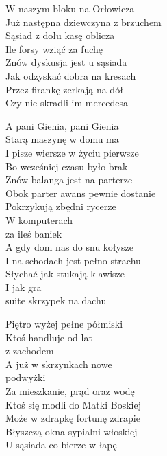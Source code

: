 \begin{text}
    W naszym bloku na Orłowicza\\
    Już następna dziewczyna z brzuchem\\
    Sąsiad z dołu kasę oblicza\\
    Ile forsy wziąć za fuchę\\
    Znów dyskusja jest u sąsiada\\
    Jak odzyskać dobra na kresach\\
    Przez firankę zerkają na dół\\
    Czy nie skradli im mercedesa

    \vin A pani Gienia, pani Gienia\\
    \vin Starą maszynę w domu ma\\
    \vin I pisze wiersze w życiu pierwsze\\
    \vin Bo wcześniej czasu było brak\\

    Znów balanga jest na parterze\\
    Obok parter awans pewnie dostanie\\
    Pokrzykują zbędni rycerze\\
    W komputerach\\
    za ileś baniek\\
    A gdy dom nas do snu kołysze\\
    I na schodach jest pełno strachu\\
    Słychać jak stukają klawisze\\
    I jak gra\\
    suite skrzypek na dachu

    Piętro wyżej pełne półmiski\\
    Ktoś handluje od lat\\
    z zachodem\\
    A już w skrzynkach nowe\\
    podwyżki\\
    Za mieszkanie, prąd oraz wodę\\
    Ktoś się modli do Matki Boskiej\\
    Może w zdrapkę fortunę zdrapie\\
    Błyszczą okna sypialni włoskiej\\
    U sąsiada co bierze w łapę
\end{text}
\begin{chord}

\end{chord}